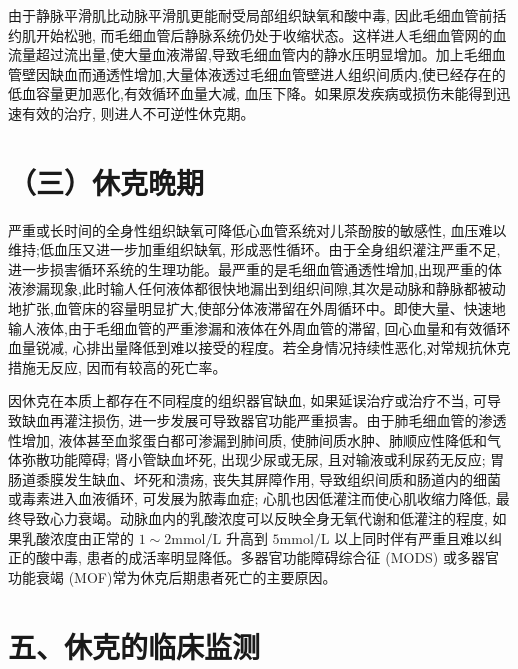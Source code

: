 \documentclass[10pt]{article}
\begin{document}
由于静脉平滑肌比动脉平滑肌更能耐受局部组织缺氧和酸中毒, 因此毛细血管前括约肌开始松驰, 而毛细血管后静脉系统仍处于收缩状态。这样进人毛细血管网的血流量超过流出量,使大量血液滞留,导致毛细血管内的静水压明显增加。加上毛细血管壁因缺血而通透性增加,大量体液透过毛细血管壁进人组织间质内,使已经存在的低血容量更加恶化,有效循环血量大减, 血压下降。如果原发疾病或损伤未能得到迅速有效的治疗, 则进人不可逆性休克期。

\section*{（三）休克晩期}
严重或长时间的全身性组织缺氧可降低心血管系统对儿茶酚胺的敏感性, 血压难以维持;低血压又进一步加重组织缺氧, 形成恶性循环。由于全身组织灌注严重不足, 进一步损害循环系统的生理功能。最严重的是毛细血管通透性增加,出现严重的体液渗漏现象,此时输人任何液体都很快地漏出到组织间隙,其次是动脉和静脉都被动地扩张,血管床的容量明显扩大,使部分体液滞留在外周循环中。即使大量、快速地输人液体,由于毛细血管的严重渗漏和液体在外周血管的滞留, 回心血量和有效循环血量锐减, 心排出量降低到难以接受的程度。若全身情况持续性恶化,对常规抗休克措施无反应, 因而有较高的死亡率。

因休克在本质上都存在不同程度的组织器官缺血, 如果延误治疗或治疗不当, 可导致缺血再灌注损伤, 进一步发展可导致器官功能严重损害。由于肺毛细血管的渗透性增加, 液体甚至血浆蛋白都可渗漏到肺间质, 使肺间质水肿、肺顺应性降低和气体弥散功能障碍; 肾小管缺血坏死, 出现少尿或无尿, 且对输液或利尿药无反应; 胃肠道黍膜发生缺血、坏死和溃疡, 丧失其屏障作用, 导致组织间质和肠道内的细菌或毒素进入血液循环, 可发展为脓毒血症; 心肌也因低灌注而使心肌收缩力降低, 最终导致心力衰竭。动脉血内的乳酸浓度可以反映全身无氧代谢和低灌注的程度, 如果乳酸浓度由正常的 $1 \sim 2 \mathrm{mmol} / \mathrm{L}$ 升高到 $5 \mathrm{mmol} / \mathrm{L}$ 以上同时伴有严重且难以纠正的酸中毒, 患者的成活率明显降低。多器官功能障碍综合征 (MODS) 或多器官功能衰竭 (MOF)常为休克后期患者死亡的主要原因。

\section*{五、休克的临床监测}
\end{document}
